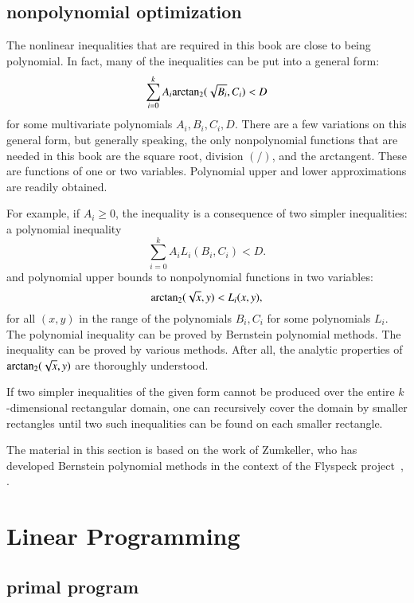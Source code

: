 \subsection{nonpolynomial optimization}

The nonlinear inequalities that are required in this book are close to
being polynomial.  In fact, many  of the inequalities can be put into a
general form:
\begin{equation}\label{eqn:ABCD}
\sum_{i=0}^k A_i {\operatorname{arctan_2}}(\sqrt{B_i},C_i) < D
\end{equation}
for some multivariate polynomials $A_i,B_i,C_i,D$.  There are a few
variations on this general form, but generally speaking, the only
nonpolynomial functions that are needed in this book are the square
root, division $(/)$, and the arctangent.  These
are functions of one or two variables.  Polynomial upper and lower
approximations are readily obtained.

For example, if $A_i\ge 0$, the inequality  is a
consequence of two simpler inequalities: a polynomial inequality
\[
\sum_{i=0}^k A_i L_i(B_i,C_i) < D.
\]
and polynomial upper bounds to nonpolynomial functions in two variables:
\begin{equation}\label{eqn:sL}
{\operatorname{arctan\ensuremath{_2}}}(\sqrt{x},y) < L_i(x,y),
\end{equation}
for all $(x,y)$ in the range of the polynomials $B_i,C_i$ for some
polynomials $L_i$.  The polynomial
inequality can be proved by Bernstein polynomial methods.  The
inequality  can be proved by various methods.  After all,
the analytic properties of ${\operatorname{arctan_2}}(\sqrt{x},y)$ are thoroughly
understood.

If two simpler inequalities of the given form cannot be produced over
the entire $k$-dimensional rectangular domain, one can recursively
cover the domain by smaller rectangles until two such inequalities can
be found on each smaller rectangle.

The material in this section is based on the work of Zumkeller, who
has developed Bernstein polynomial methods in the context of the
Flyspeck project~\cite{roland-thesis}, \cite{zumkeller-nonlinear}.


\section{Linear Programming}\label{sec:lp}

\subsection{primal program}

